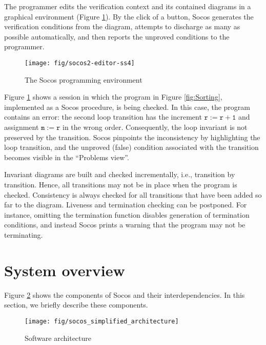 \documentclass[english,submission]{eptcs}
\begin{document}
The programmer edits the verification context and its contained diagrams
in a graphical environment (Figure \ref{fig:SelectionSort}). By the
click of a button, Socos generates the verification conditions from
the diagram, attempts to discharge as many as possible automatically,
and then reports the unproved conditions to the programmer. 
\begin{figure}[h]
\begin{centering}
\texttt{[image: fig/socos2-editor-ss4]}
\par\end{centering}

\caption{The Socos programming environment\label{fig:SelectionSort}}
\end{figure}
Figure \ref{fig:SelectionSort} shows a session in which the
program in Figure \ref{fig:Sorting}, implemented as a Socos procedure,
is being checked. In this case, the program contains an error: the
second loop transition has the increment $\mathtt{r:=r+1}$ and assignment
$\mathtt{m:=r}$ in the wrong order. Consequently, the loop invariant
is not preserved by the transition. Socos pinpoints the inconsistency
by highlighting the loop transition, and the unproved (false) condition
associated with the transition becomes visible in the {}``Problems
view''. 

Invariant diagrams are built and checked incrementally, i.e., transition
by transition. Hence, all transitions may not be in place when the
program is checked. Consistency is always checked for all transitions
that have been added so far to the diagram. Liveness and termination
checking can be postponed. For instance, omitting the termination
function disables generation of termination conditions, and instead
Socos prints a warning that the program may not be terminating.


\section{System overview\label{sec:System-overview}}

Figure \ref{fig:Architecture} shows the components of Socos and their
interdependencies. In this section, we briefly describe these components.

\begin{figure}[h]
\begin{centering}
\texttt{[image: fig/socos\_simplified\_architecture]}
\par\end{centering}

\caption{Software architecture\label{fig:Architecture}}
\end{figure}
\end{document}
